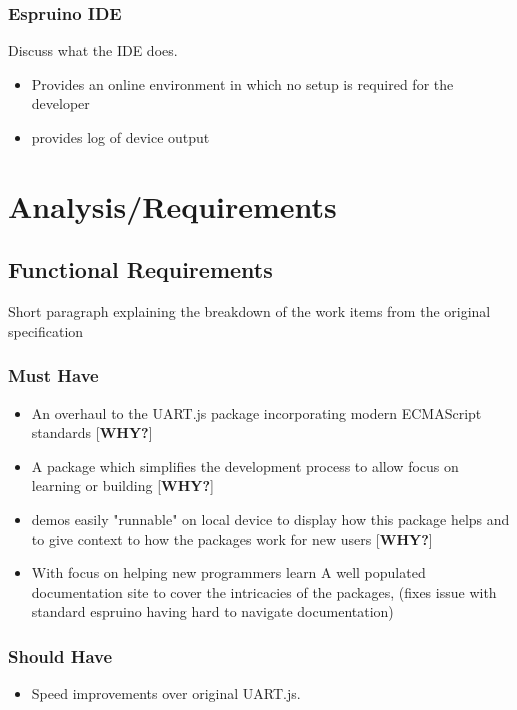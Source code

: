 \documentclass{l4proj}
\begin{document}
\subsection{Espruino IDE}
Discuss what the IDE does.
\begin{itemize}
    \item Provides an online environment in which no setup is required for the developer 
    \item provides log of device output
    
\end{itemize}

\chapter{Analysis/Requirements}
\section{Functional Requirements}
Short paragraph explaining the breakdown of the work items from the original specification
\subsection{Must Have}
\begin{itemize}
    \item An overhaul to the UART.js package incorporating modern ECMAScript standards [\textbf{WHY?}]
    \item A package which simplifies the development process to allow focus on learning or building [\textbf{WHY?}]
    \item demos easily "runnable" on local device to display how this package helps and to give context to how the packages work for new users [\textbf{WHY?}]
    \item With focus on helping new programmers learn A well populated documentation site to cover the intricacies of the packages, (fixes issue with standard espruino having hard to navigate documentation)
\end{itemize}
\subsection{Should Have}
\begin{itemize}
    \item Speed improvements over original UART.js.
\end{itemize}
\end{document}
